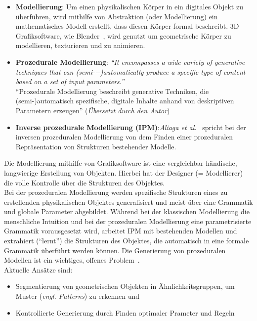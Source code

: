 \documentclass[11pt]{article}
\begin{document}
    \newpage

    \begin{itemize}
        \item \textbf{Modellierung}: Um einen physikalischen Körper in ein digitales Objekt zu überführen, wird mithilfe
        von Abstraktion (oder Modellierung) ein mathematisches Modell erstellt, dass diesen Körper formal beschreibt.
        3D Grafiksoftware, wie Blender~\cite{blender}, wird genutzt um geometrische Körper zu modellieren, texturieren
        und zu animieren.
        \item \textbf{Prozedurale Modellierung}: \textit{"`It encompasses a wide variety of generative techniques that
        can (semi-−)automatically produce a specific type of content based on a set of input
        parameters."'}~\cite{1} \\
        "`Prozedurale Modellierung beschreibt generative Techniken, die \\(semi-)automatisch spezifische, digitale
        Inhalte anhand von deskriptiven Parametern erzeugen"' (\textit{Übersetzt durch den Autor})
        \item \textbf{Inverse prozedurale Modellierung (IPM)}:\textit{Aliaga et al.}~\cite{2}
        spricht bei der inversen prozeduralen Modellierung von dem Finden einer prozeduralen Repräsentation von
        Strukturen bestehender Modelle.
    \end{itemize}
    Die Modellierung mithilfe von Grafiksoftware ist eine vergleichbar händische, langwierige Erstellung von
    Objekten.
    Hierbei hat der Designer (= Modellierer) die volle Kontrolle über die Strukturen des Objektes.\\
    Bei der prozeduralen Modellierung werden spezifische Strukturen eines zu erstellenden physikalischen Objektes
    generalisiert und meist über eine Grammatik und globale Parameter abgebildet.
    Während bei der klassischen Modellierung die menschliche Intuition und bei der prozeduralen Modellierung eine
    parametrisierte Grammatik vorausgesetzt wird, arbeitet IPM mit bestehenden Modellen und extrahiert ("`lernt"')
    die Strukturen des Objektes, die automatisch in eine formale Grammatik überführt werden können.
    Die Generierung von prozeduralen Modellen ist ein wichtiges, offenes Problem~\cite{2}.\\
    Aktuelle Ansätze sind:
    \begin{itemize}
        \item Segmentierung von geometrischen Objekten in Ähnlichkeitsgruppen, um Muster (\textit{engl. Patterns}) zu
        erkennen und
        \item Kontrollierte Generierung durch Finden optimaler Prameter und Regeln
    \end{itemize}
\end{document}

